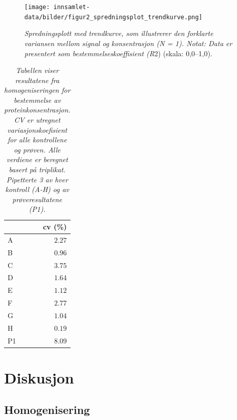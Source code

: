 \documentclass[
  letterpaper,
  DIV=11,
  numbers=noendperiod]{scrreprt}
\begin{document}
\begin{figure}

{\centering \texttt{[image: innsamlet-data/bilder/figur2\_spredningsplot\_trendkurve.png]}

}

\caption{\emph{Spredningsplott med trendkurve, som illustrerer den
forklarte variansen mellom signal og konsentrasjon (N = 1). Notat: Data
er presentert som bestemmelseskoeffisient (R}2) (skala: 0,0--1,0).}

\end{figure}

\newpage

\hypertarget{tbl-tabell1}{}
\begin{longtable}{lr}
\caption{\label{tbl-tabell1}\emph{Tabellen viser resultatene fra homogeniseringen for bestemmelse av
proteinkonsentrasjon. CV er utregnet variasjonskoefisient for alle
kontrollene og prøven. Alle verdiene er beregnet basert på triplikat.
Pipetterte 3 av hver kontroll (A-H) og av prøveresultatene (P1).} }\tabularnewline

\toprule
 & cv (\%) \\ 
\midrule\addlinespace[2.5pt]
A & $2.27$ \\ 
B & $0.96$ \\ 
C & $3.75$ \\ 
D & $1.64$ \\ 
E & $1.12$ \\ 
F & $2.77$ \\ 
G & $1.04$ \\ 
H & $0.19$ \\ 
P1 & $8.09$ \\ 
\bottomrule
\end{longtable}

\hypertarget{diskusjon}{%
\section{\texorpdfstring{\textbf{Diskusjon}}{Diskusjon}}\label{diskusjon}}

\hypertarget{homogenisering}{%
\subsection{\texorpdfstring{\textbf{Homogenisering}}{Homogenisering}}\label{homogenisering}}
\end{document}
